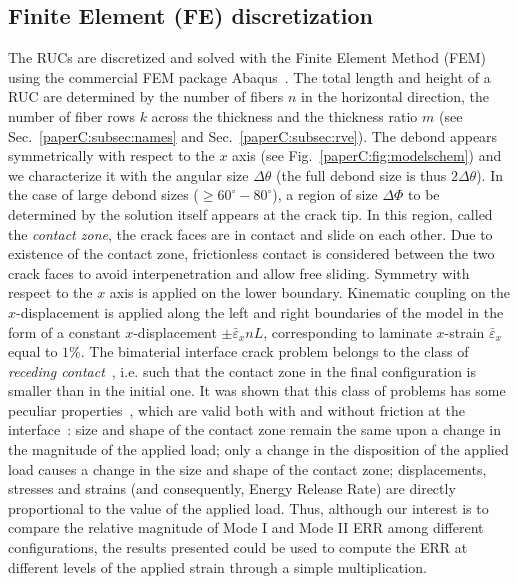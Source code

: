 
\subsection{Finite Element (FE) discretization}

The RUCs are discretized and solved with the Finite Element Method (FEM) using the commercial FEM package Abaqus~\cite{abq12}. The total length and height of a RUC are determined by the number of fibers $n$ in the horizontal direction, the number of fiber rows $k$ across the thickness and the thickness ratio $m$ (see Sec.~\ref{paperC:subsec:names} and Sec.~\ref{paperC:subsec:rve}). The debond appears symmetrically with respect to the $x$ axis (see Fig.~\ref{paperC:fig:modelschem}) and we characterize it with the angular size $\Delta\theta$ (the full debond size is thus $2\Delta\theta$). In the case of large debond sizes ($\geq 60^{\circ}-80^{\circ}$), a region of size $\Delta\Phi$ to be determined by the solution itself appears at the crack tip. In this region, called the \emph{contact zone}, the crack faces are in contact and slide on each other. Due to existence of the contact zone, frictionless contact is considered between the two crack faces to avoid interpenetration and allow free sliding. Symmetry with respect to the $x$ axis is applied on the lower boundary. Kinematic coupling on the $x$-displacement is applied along the left and right boundaries of the model in the form of a constant $x$-displacement $\pm\bar{\varepsilon}_{x} nL$, corresponding to laminate $x$-strain $\bar{\varepsilon}_{x}$ equal to $1\%$. The bimaterial interface crack problem belongs to the class of \emph{receding contact}~\cite{Paris1996,Garrido1991}, i.e. such that the contact zone in the final configuration is smaller than in the initial one. It was shown that this class of problems has some peculiar properties~\cite{Keer1972,Tsai1974}, which are valid both with and without friction at the interface~\cite{Paris1996,Garrido1991}: size and shape of the contact zone remain the same upon a change in the magnitude of the applied load; only a change in the disposition of the applied load causes a change in the size and shape of the contact zone; displacements, stresses and strains (and consequently, Energy Release Rate) are directly proportional to the value of the applied load. Thus, although our interest is to compare the relative magnitude of Mode I and Mode II ERR among different configurations, the results presented could be used to compute the ERR at different levels of the applied strain through a simple multiplication.\\

